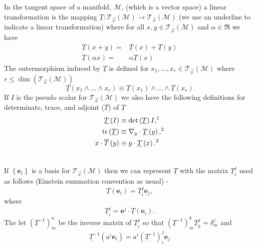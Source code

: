 \documentclass[12pt]{report}
\newcommand{\bm}[1]{\boldsymbol{#1}}
\newcommand{\lp}{\left (}
\newcommand{\rp}{\right )}
\newcommand{\lbrc}{\left \{}
\newcommand{\rbrc}{\right \}}
\newcommand{\set}[1]{\lbrc {#1} \rbrc}
\newcommand{\W}{\wedge}
\newcommand{\f}[2]{{#1}\lp {#2} \rp}
\newcommand{\paren}[1]{\lp {#1} \rp}
\newcommand{\be}{\begin{equation}}
\newcommand{\ee}{\end{equation}}
\newcommand{\eb}{\bm{e}}
\newcommand{\Tn}[2]{\f{\mathcal{T}_{#2}}{#1}}
\newcommand{\tr}{\mbox{tr}}
\begin{document}
In the tangent space of a manifold, $\mathcal{M}$, (which is a vector space) a linear transformation is the mapping
$\underline{T}\colon\Tn{\mathcal{M}}{\vec{x}}\rightarrow\Tn{\mathcal{M}}{\vec{x}}$ (we use an underline to indicate
a linear transformation) where for all $x,y\in \Tn{\mathcal{M}}{\vec{x}}$ and $\alpha\in\Re$ we have
\begin{align}
    \f{\underline{T}}{x+y} =& \f{\underline{T}}{x} + \f{\underline{T}}{y} \\
    \f{\underline{T}}{\alpha x} =& \alpha\f{\underline{T}}{x}
\end{align}
The outermorphism induced by $\underline{T}$ is defined for $x_{1},\dots,x_{r}\in\Tn{\mathcal{M}}{\vec{x}}$ where
$r\le\f{\dim}{\Tn{\mathcal{M}}{\vec{x}}}$
\be
    \f{\underline{T}}{x_{1}\W\dots\W x_{r}} \equiv \f{\underline{T}}{x_{1}}\W\dots\W\f{\underline{T}}{x_{r}}
\ee
If $I$ is the pseudo scalar for $\Tn{\mathcal{M}}{\vec{x}}$ we also have the following definitions for determinate, trace,
and adjoint ($\overline{T}$) of $\underline{T}$
\begin{align}
    \f{\underline{T}}{I} \equiv&\; \f{\det}{\underline{T}}I\text{,\footnotemark} \label{eq_82}\\
    \f{\tr}{\underline{T}} \equiv&\; \nabla_{y}\cdot\f{\underline{T}}{y}\text{,\footnotemark} \label{eq_83}\\ \addtocounter{footnote}{-1}
    x\cdot \f{\overline{T}}{y} \equiv&\; y\cdot \f{\underline{T}}{x}.\text{\footnotemark} \label{eq_84}\\ \addtocounter{footnote}{-1}
\end{align}
\addtocounter{footnote}{1}
\addtocounter{footnote}{1}
If $\set{\eb_{i}}$ is a basis for $\Tn{\mathcal{M}}{\vec{x}}$ then we can represent $\underline{T}$ with the matrix $\underline{T}_{i}^{j}$ used
as follows (Einstein summation convention as usual) -
\be\label{eq_85}
    \f{\underline{T}}{\eb_{i}} = \underline{T}_{i}^{j}\eb_{j},
\ee
where
\be\label{eq_85a}
    \underline{T}_{i}^{j} = \eb^{j}\cdot\f{\underline{T}}{\eb_{i}}.
\ee
The let $\paren{\underline{T}^{-1}}_{m}^{n}$ be the inverse matrix of $\underline{T}_{i}^{j}$ so that 
$\paren{\underline{T}^{-1}}_{m}^{k}\underline{T}_{k}^{j} = \delta^{j}_{m}$ and 
\begin{equation}
\underline{T}^{-1}\paren{a^{i}\eb_{i}} = a^{i}\paren{\underline{T}^{-1}}_{i}^{j}\eb_{j}
\end{equation}
\end{document}

